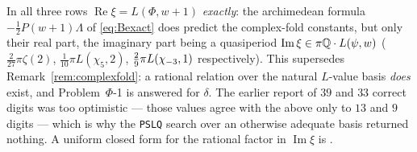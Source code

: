 \begin{remark}\label{rem:complexfold2}
In all three rows $\operatorname{Re}\xi=L(\Phi,w+1)$ \emph{exactly}: the
archimedean formula $-\tfrac12P(w+1)\Lambda$ of \eqref{eq:Bexact} does predict
the complex-fold constants, but only their real part, the imaginary part being
a quasiperiod $\operatorname{Im}\xi\in\pi\mathbb{Q}\cdot L(\psi,w)$
($\tfrac2{27}\pi\zeta(2)$, $\tfrac1{10}\pi L(\chi_5,2)$,
$\tfrac29\pi L(\chi_{-3},1)$ respectively).  This supersedes
Remark~\ref{rem:complexfold}: a rational relation over the natural $L$-value
basis \emph{does} exist, and Problem~$\Phi$-1 is answered for $\delta$.  The
earlier report of $39$ and $33$ correct digits was too optimistic --- those
values agree with the above only to $13$ and $9$ digits --- which is why the
\texttt{PSLQ} search over an otherwise adequate basis returned nothing.  A
uniform closed form for the rational factor in $\operatorname{Im}\xi$ is
\Open{}.
\end{remark}
